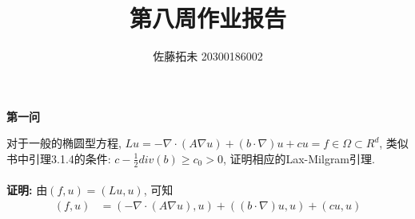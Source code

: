 \documentclass[12pt]{article}
\title{第八周作业报告}
\author{佐藤拓未 20300186002}
\date{}
\begin{document}
	
	
	
	
	\maketitle
	
	
	\begin{center}
		\textbf{第一问}
	\end{center}

\noindent 对于一般的椭圆型方程, $Lu = -\nabla\cdot (A\nabla u) + (b\cdot\nabla)u + cu = f \in\Omega\subset R^d$, 类似书中引理3.1.4的条件: $c-\frac{1}{2}div (b)\geq c_0 >0$, 证明相应的Lax-Milgram引理.\\
\quad \\
\noindent \textbf{证明:} 由$(f,u)=(Lu,u)$, 可知
\begin{align*}
	(f,u)&=(-\nabla\cdot (A\nabla u),u)+((b\cdot\nabla)u,u)+(cu,u)
\end{align*}
\end{document}
